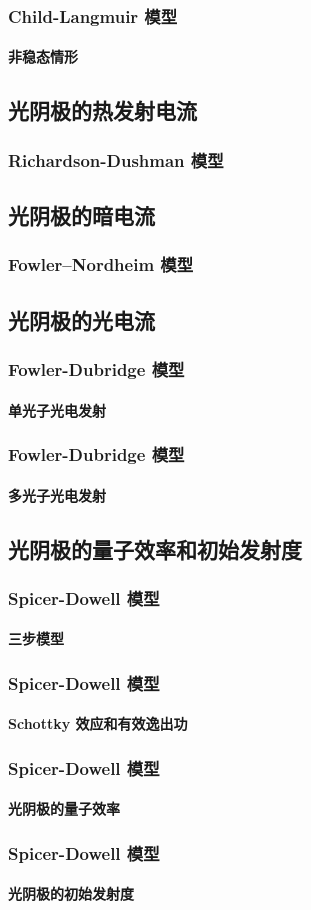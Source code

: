 \documentclass[ignorenonframetext, t]{beamer}
\begin{document}
\begin{frame}[label=current]
	\frametitle{Child-Langmuir 模型}
	\framesubtitle{非稳态情形}
\end{frame}

\subsection{光阴极的热发射电流}

\begin{frame}
	\frametitle{Richardson-Dushman 模型}
\end{frame}

\subsection{光阴极的暗电流}

\begin{frame}
	\frametitle{Fowler–Nordheim 模型}
\end{frame}

\subsection{光阴极的光电流}

\begin{frame}
	\frametitle{Fowler-Dubridge 模型}
	\framesubtitle{单光子光电发射}
\end{frame}

\begin{frame}
	\frametitle{Fowler-Dubridge 模型}
	\framesubtitle{多光子光电发射}
\end{frame}

\subsection{光阴极的量子效率和初始发射度}

\begin{frame}
	\frametitle{Spicer-Dowell 模型}
	\framesubtitle{三步模型}
\end{frame}

\begin{frame}
	\frametitle{Spicer-Dowell 模型}
	\framesubtitle{Schottky 效应和有效逸出功}
\end{frame}

\begin{frame}
	\frametitle{Spicer-Dowell 模型}
	\framesubtitle{光阴极的量子效率}
\end{frame}

\begin{frame}
	\frametitle{Spicer-Dowell 模型}
	\framesubtitle{光阴极的初始发射度}
\end{frame}
\end{document}

